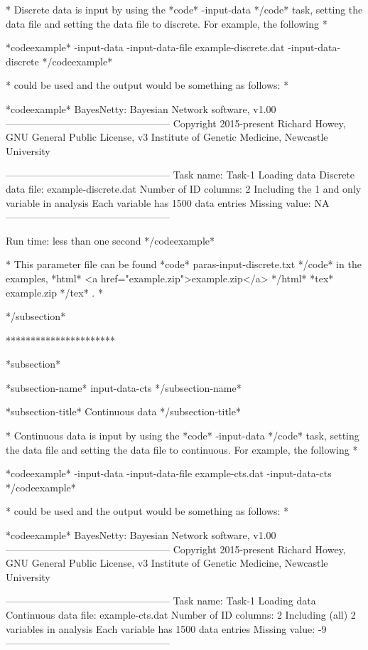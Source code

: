 * Discrete data is input by using the *code* -input-data */code* task, setting the data file and setting the data file to discrete. For example, the following *

*codeexample* -input-data -input-data-file example-discrete.dat -input-data-discrete */codeexample*

* could be used and the output would be something as follows: *

*codeexample* BayesNetty: Bayesian Network software, v1.00 -------------------------------------------------- Copyright 2015-present Richard Howey, GNU General Public License, v3 Institute of Genetic Medicine, Newcastle University

-------------------------------------------------- Task name: Task-1 Loading data Discrete data file: example-discrete.dat Number of ID columns: 2 Including the 1 and only variable in analysis Each variable has 1500 data entries Missing value: NA --------------------------------------------------

Run time: less than one second */codeexample*

* This parameter file can be found *code* paras-input-discrete.txt */code* in the examples, *html* <a href="example.zip">example.zip</a> */html* *tex* example.zip */tex* . *

*/subsection*

**********************

*subsection*

*subsection-name* input-data-cts */subsection-name*

*subsection-title* Continuous data */subsection-title*

* Continuous data is input by using the *code* -input-data */code* task, setting the data file and setting the data file to continuous. For example, the following *

*codeexample* -input-data -input-data-file example-cts.dat -input-data-cts */codeexample*

* could be used and the output would be something as follows: *

*codeexample* BayesNetty: Bayesian Network software, v1.00 -------------------------------------------------- Copyright 2015-present Richard Howey, GNU General Public License, v3 Institute of Genetic Medicine, Newcastle University

-------------------------------------------------- Task name: Task-1 Loading data Continuous data file: example-cts.dat Number of ID columns: 2 Including (all) 2 variables in analysis Each variable has 1500 data entries Missing value: -9 --------------------------------------------------

